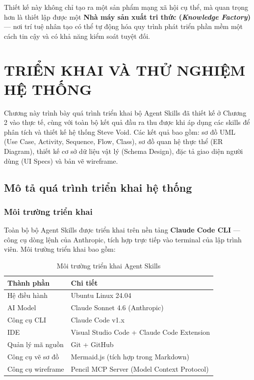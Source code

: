 \documentclass[13pt,a4paper,oneside]{extreport}
\numberwithin{equation}{chapter}
\numberwithin{figure}{chapter}
\numberwithin{table}{chapter}
\begin{document}
Thiết kế này không chỉ tạo ra một sản phẩm mạng xã hội cụ thể, mà quan trọng hơn là thiết lập được một \textbf{Nhà máy sản xuất tri thức (\textit{Knowledge Factory})} — nơi trí tuệ nhân tạo có thể tự động hóa quy trình phát triển phần mềm một cách tin cậy và có khả năng kiểm soát tuyệt đối.

\chapter{TRIỂN KHAI VÀ THỬ NGHIỆM HỆ THỐNG}

Chương này trình bày quá trình triển khai bộ Agent Skills đã thiết kế ở Chương 2 vào thực tế, cùng với toàn bộ kết quả đầu ra thu được khi áp dụng các skills để phân tích và thiết kế hệ thống Steve Void. Các kết quả bao gồm: sơ đồ UML (Use Case, Activity, Sequence, Flow, Class), sơ đồ quan hệ thực thể (ER Diagram), thiết kế cơ sở dữ liệu vật lý (Schema Design), đặc tả giao diện người dùng (UI Specs) và bản vẽ wireframe.

\section{Mô tả quá trình triển khai hệ thống}

\subsection{Môi trường triển khai}

Toàn bộ bộ Agent Skills được triển khai trên nền tảng \textbf{Claude Code CLI} — công cụ dòng lệnh của Anthropic, tích hợp trực tiếp vào terminal của lập trình viên. Môi trường triển khai bao gồm:

\begin{table}[H]
\centering
\caption{Môi trường triển khai Agent Skills}
\begin{tabular}{|p{4cm}|p{9.5cm}|}
\hline
\textbf{Thành phần} & \textbf{Chi tiết} \\
\hline
Hệ điều hành & Ubuntu Linux 24.04 \\
\hline
AI Model & Claude Sonnet 4.6 (Anthropic) \\
\hline
Công cụ CLI & Claude Code v1.x \\
\hline
IDE & Visual Studio Code + Claude Code Extension \\
\hline
Quản lý mã nguồn & Git + GitHub \\
\hline
Công cụ vẽ sơ đồ & Mermaid.js (tích hợp trong Markdown) \\
\hline
Công cụ wireframe & Pencil MCP Server (Model Context Protocol) \\
\hline
\end{tabular}
\end{table}
\end{document}
